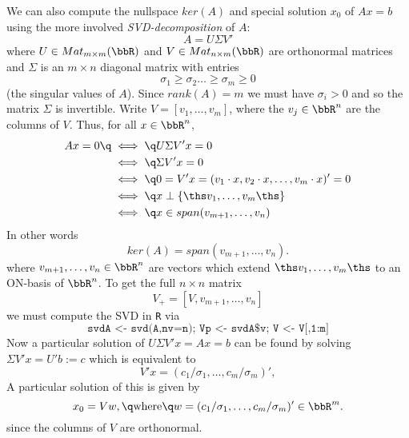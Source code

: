 We can also compute the nullspace $ker(A)$ and special solution $x_0$ of $Ax=b$ using
the more involved \textit{SVD-decomposition} of $A$:
$$
A=U\Sigma V'
$$
where $U\in Mat_{m\times m}(\bbR)$ and $V\in Mat_{n\times m}(\bbR)$ are orthonormal matrices 
and $\Sigma$ is an $m\times n$ diagonal matrix with entries
$$
\sigma_1\geq\sigma_2\dots\geq\sigma_m\geq 0
$$
(the singular values of $A$). Since $rank(A)=m$ we must have $\sigma_i>0$
and so the matrix $\Sigma$ is invertible.
Write $V=[v_1,\dots,v_m]$, where the $v_j\in\bbR^n$ are the columns of $V$.
Thus, for all $x\in\bbR^n$,
%
\begin{align*}
Ax=0\q&\iff\q U\Sigma V'x=0
\\&\iff\q 
\Sigma V'x=0
\\&\iff\q 
0=V'x=(v_1\cdot x,v_2\cdot x,\dots,v_m\cdot x)'=0
\\&\iff\q
x\perp\{\ths v_1,\dots,v_m\ths\}
\\&\iff\q
x\in span(v_{m+1},\dots,v_n)
\end{align*}
%
In other words
%
\begin{equation}
\label{nullspace_QR}
ker(A)=span(v_{m+1},\dots,v_n).
\end{equation}
%
where $v_{m+1},\dots,v_n\in\bbR^n$ are vectors which extend ${\ths v_1,\dots,v_m\ths}$
to an ON-basis of $\bbR^n$. To get the full $n\times n$ matrix
$$
V_+=[V,v_{m+1},\dots,v_n]
$$
we must compute the SVD in \texttt{R} via 
$$
\texttt{svdA <- svd(A,nv=n); Vp <- svdA\$v; V <- V[,1:m]}
$$
Now a particular solution of $U\Sigma V'x=Ax=b$ can be found by solving
$\Sigma V'x=U'b:=c$ which is equivalent to 
$$
V'x=(c_1/\sigma_1,\dots,c_m/\sigma_m)',
$$
A particular solution of this is given by
%
\begin{equation}
\label{x0_SVD}
x_0=Vw,\q\text{where}\q w=(c_1/\sigma_1,\dots,c_m/\sigma_m)'\in\bbR^m.
\end{equation}
%
since the columns of $V$ are orthonormal.